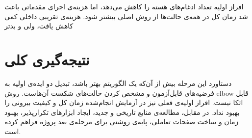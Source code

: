 افراز اولیه تعداد ادغام‌های هسته را کاهش می‌دهد، اما هزینه‌ی اجرای
 مقدماتی باعث شد زمان کل در همه‌ی حالت‌ها از روش اصلی بیشتر
شود. هزینه‌ی تقریبی داخلی کمی کاهش یافت، ولی  و  بدتر

\section{نتیجه‌گیری کلی}

دستاورد این مرحله بیش از آن‌که یک الگوریتم بهتر باشد، تبدیل دو ایده‌ی اولیه
به فرضیه‌های قابل‌آزمون و مشخص کردن حالت‌های شکست آن‌هاست. روش elbow قابل اتکا نیست. افراز اولیه‌ی فعلی نیز در آزمایش
انجام‌شده زمان کل و کیفیت بیرونی را بهبود نداد. در مقابل، مطالعه‌ی منابع
تاریخی و جدید، ایجاد ابزارهای تکرارپذیر، بهبود زمان و ساخت صفحات
تعاملی، پایه‌ی روشنی برای مرحله‌ی بعد پروژه فراهم کرده است.
